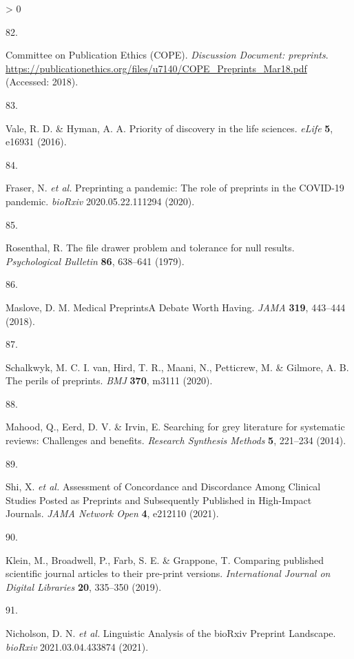 \documentclass[a4paper, twoside]{templates/ociamthesis}
\newlength{\cslhangindent}
\newlength{\csllabelwidth}
\newenvironment{CSLReferences}[3] %
 {%
  \setlength{\parindent}{0pt}
  \ifodd #1 \everypar{\setlength{\hangindent}{\cslhangindent}}\ignorespaces\fi
  \ifnum #2 > 0
  \setlength{\parskip}{#2\baselineskip}
  \fi
 }%
 {}
\newcommand{\CSLLeftMargin}[1]{\parbox[t]{\maxof{\widthof{#1}}{\csllabelwidth}}{#1}}
\newcommand{\CSLRightInline}[1]{\parbox[t]{\linewidth - \csllabelwidth}{#1}}
\begin{document}
\begin{CSLReferences}{0}{0}
\leavevmode\hypertarget{ref-committeeonpublicationethicscope2018}{}%
\CSLLeftMargin{82. }
\CSLRightInline{Committee on Publication Ethics (COPE). \emph{Discussion {Document}: preprints}. \url{https://publicationethics.org/files/u7140/COPE_Preprints_Mar18.pdf} (Accessed: 2018).}

\leavevmode\hypertarget{ref-vale2016}{}%
\CSLLeftMargin{83. }
\CSLRightInline{Vale, R. D. \& Hyman, A. A. Priority of discovery in the life sciences. \emph{eLife} \textbf{5}, e16931 (2016).}

\leavevmode\hypertarget{ref-fraser2020preprinting}{}%
\CSLLeftMargin{84. }
\CSLRightInline{Fraser, N. \emph{et al.} Preprinting a pandemic: The role of preprints in the {COVID}-19 pandemic. \emph{bioRxiv} 2020.05.22.111294 (2020).}

\leavevmode\hypertarget{ref-rosenthal1979}{}%
\CSLLeftMargin{85. }
\CSLRightInline{Rosenthal, R. The file drawer problem and tolerance for null results. \emph{Psychological Bulletin} \textbf{86}, 638--641 (1979).}

\leavevmode\hypertarget{ref-maslove2018}{}%
\CSLLeftMargin{86. }
\CSLRightInline{Maslove, D. M. Medical {Preprints}{{A Debate Worth Having}}. \emph{JAMA} \textbf{319}, 443--444 (2018).}

\leavevmode\hypertarget{ref-schalkwyk2020}{}%
\CSLLeftMargin{87. }
\CSLRightInline{Schalkwyk, M. C. I. van, Hird, T. R., Maani, N., Petticrew, M. \& Gilmore, A. B. The perils of preprints. \emph{BMJ} \textbf{370}, m3111 (2020).}

\leavevmode\hypertarget{ref-mahood2014}{}%
\CSLLeftMargin{88. }
\CSLRightInline{Mahood, Q., Eerd, D. V. \& Irvin, E. Searching for grey literature for systematic reviews: Challenges and benefits. \emph{Research Synthesis Methods} \textbf{5}, 221--234 (2014).}

\leavevmode\hypertarget{ref-shi2021}{}%
\CSLLeftMargin{89. }
\CSLRightInline{Shi, X. \emph{et al.} Assessment of {Concordance} and {Discordance Among Clinical Studies Posted} as {Preprints} and {Subsequently Published} in {High}-{Impact Journals}. \emph{JAMA Network Open} \textbf{4}, e212110 (2021).}

\leavevmode\hypertarget{ref-klein2019}{}%
\CSLLeftMargin{90. }
\CSLRightInline{Klein, M., Broadwell, P., Farb, S. E. \& Grappone, T. Comparing published scientific journal articles to their pre-print versions. \emph{International Journal on Digital Libraries} \textbf{20}, 335--350 (2019).}

\leavevmode\hypertarget{ref-nicholson2021}{}%
\CSLLeftMargin{91. }
\CSLRightInline{Nicholson, D. N. \emph{et al.} Linguistic {Analysis} of the {bioRxiv Preprint Landscape}. \emph{bioRxiv} 2021.03.04.433874 (2021).}


\end{CSLReferences}
\end{document}
